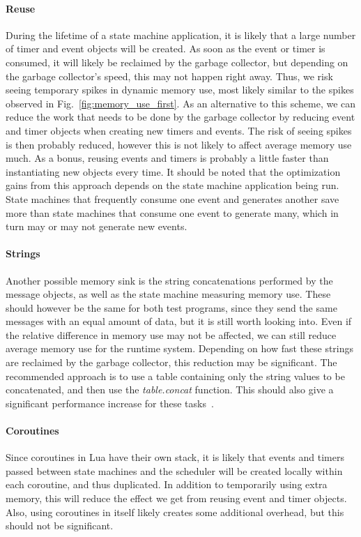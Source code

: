 \paragraph{Reuse} During the lifetime of a state machine application, it is likely that a large number of timer and event objects will be created. As soon as the event or timer is consumed, it will likely be reclaimed by the garbage collector, but depending on the garbage collector's speed, this may not happen right away. Thus, we risk seeing temporary spikes in dynamic memory use, most likely similar to the spikes observed in Fig.~\ref{fig:memory_use_first}. As an alternative to this scheme, we can reduce the work that needs to be done by the garbage collector by reducing event and timer objects when creating new timers and events. The risk of seeing spikes is then probably reduced, however this is not likely to affect average memory use much. As a bonus, reusing events and timers is probably a little faster than instantiating new objects every time. It should be noted that the optimization gains from this approach depends on the state machine application being run. State machines that frequently consume one event and generates another save more than state machines that consume one event to generate many, which in turn may or may not generate new events.

\paragraph{Strings} Another possible memory sink is the string concatenations performed by the message objects, as well as the state machine measuring memory use. These should however be the same for both test programs, since they send the same messages with an equal amount of data, but it is still worth looking into. Even if the relative difference in memory use may not be affected, we can still reduce average memory use for the runtime system. Depending on how fast these strings are reclaimed by the garbage collector, this reduction may be significant. The recommended approach is to use a table containing only the string values to be concatenated, and then use the \emph{table.concat} function. This should also give a significant performance increase for these tasks~\cite[Ch. 2]{book:lua_programming_gems}.

\paragraph{Coroutines} Since coroutines in Lua have their own stack, it is likely that events and timers passed between state machines and the scheduler will be created locally within each coroutine, and thus duplicated. In addition to temporarily using extra memory, this will reduce the effect we get from reusing event and timer objects. Also, using coroutines in itself likely creates some additional overhead, but this should not be significant.

